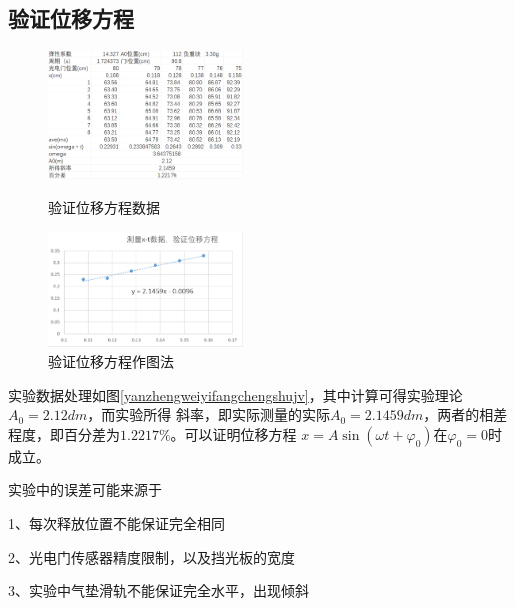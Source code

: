 \documentclass{ctexart}
\begin{document}
  \subsection{验证位移方程}
  \begin{figure}[b]
    \centering
    \begin{minipage}[b]{0.48\textwidth}
      \centering
      \includegraphics[width=0.46\textwidth]{yanzhengweiyifangchengshujv.png}
      \caption{验证位移方程数据}\label{yanzhengweiyifangchengshujv}
    \end{minipage}
    \begin{minipage}[b]{0.48\textwidth}
      \centering
      \includegraphics[width=0.46\textwidth]{yanzhengweiyifangchengzuotu.png}
      \caption{验证位移方程作图法}\label{yanzhengweiyifangchengzuotu}
    \end{minipage}
  \end{figure}

  实验数据处理如图\ref{yanzhengweiyifangchengshujv}，其中计算可得实验理论$A_{0}=2.12dm$，而实验所得
  斜率，即实际测量的实际$A_{0}=2.1459dm$，两者的相差程度，即百分差为$1.2217\%$。可以证明位移方程
  $x=A\sin \left( \omega t + {\varphi}_{0} \right) \mbox{在}{\varphi}_{0} = 0 $时成立。

  实验中的误差可能来源于

  1、每次释放位置不能保证完全相同

  2、光电门传感器精度限制，以及挡光板的宽度

  3、实验中气垫滑轨不能保证完全水平，出现倾斜
\end{document}
